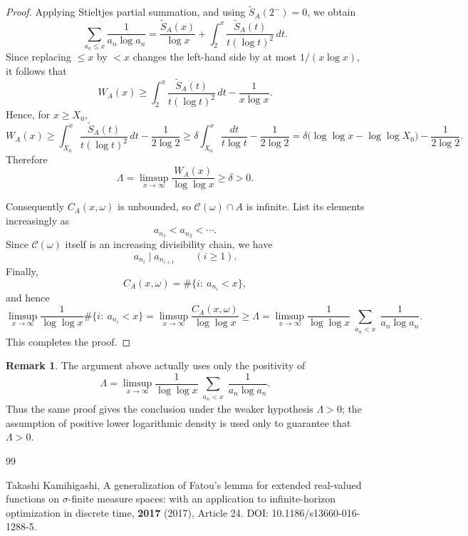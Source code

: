 \documentclass[11pt,letterpaper,reqno]{amsart}
\theoremstyle{definition}
\newtheorem{remark}[theorem]{Remark}
\numberwithin{equation}{section}
\newcommand{\1}{\mathbf 1}
\begin{document}
\begin{proof}
Applying Stieltjes partial summation, and using \(\widetilde S_A(2^-)=0\), we obtain
\[
\sum_{a_n\le x}\frac{1}{a_n\log a_n}
=
\frac{\widetilde S_A(x)}{\log x}
+
\int_2^x \frac{\widetilde S_A(t)}{t(\log t)^2}\,dt.
\]
Since replacing \(\le x\) by \(<x\) changes the left-hand side by at most \(1/(x\log x)\), it follows that
\[
W_A(x)
\ge
\int_2^x \frac{\widetilde S_A(t)}{t(\log t)^2}\,dt
-
\frac{1}{x\log x}.
\]
Hence, for \(x\ge X_0\),
\[
W_A(x)
\ge
\int_{X_0}^x \frac{\widetilde S_A(t)}{t(\log t)^2}\,dt
-
\frac{1}{2\log 2}
\ge
\delta\int_{X_0}^x \frac{dt}{t\log t}
-
\frac{1}{2\log 2}
=
\delta\bigl(\log\log x-\log\log X_0\bigr)-\frac{1}{2\log 2}.
\]
Therefore
\[
\Lambda=\limsup_{x\to\infty}\frac{W_A(x)}{\log\log x}\ge \delta>0.
\]



Consequently $C_A(x,\omega)$ is unbounded, so $\mathcal C(\omega)\cap A$ is infinite. List its elements increasingly as
\[
a_{n_1}<a_{n_2}<\cdots.
\]
Since $\mathcal C(\omega)$ itself is an increasing divisibility chain, we have
\[
a_{n_i}\mid a_{n_{i+1}}\qquad (i\ge 1).
\]
Finally,
\[
C_A(x,\omega)=\#\{i:\ a_{n_i}<x\},
\]
and hence
\[
\limsup_{x\to\infty}\frac{1}{\log\log x}\#\{i:\ a_{n_i}<x\}
=
\limsup_{x\to\infty}\frac{C_A(x,\omega)}{\log\log x}
\ge \Lambda
=
\limsup_{x\to\infty}\frac{1}{\log\log x}\sum_{\substack{a_n<x}}\frac{1}{a_n\log a_n}.
\]
This completes the proof.
\end{proof}

\begin{remark}
The argument above actually uses only the positivity of
\[
\Lambda=
\limsup_{x\to\infty}\frac{1}{\log\log x}\sum_{\substack{a_n<x}}\frac{1}{a_n\log a_n}.
\]
Thus the same proof gives the conclusion under the weaker hypothesis $\Lambda>0$; the assumption of positive lower logarithmic density is used only to guarantee that $\Lambda>0$.
\end{remark}









\begin{thebibliography}{99}



Takashi Kamihigashi,
\newblock A generalization of Fatou's lemma for extended real-valued functions on $\sigma$-finite measure spaces: with an application to infinite-horizon optimization in discrete time,
 {\bf 2017} (2017), Article 24.
\newblock DOI: 10.1186/s13660-016-1288-5.




\end{thebibliography}
\end{document}
